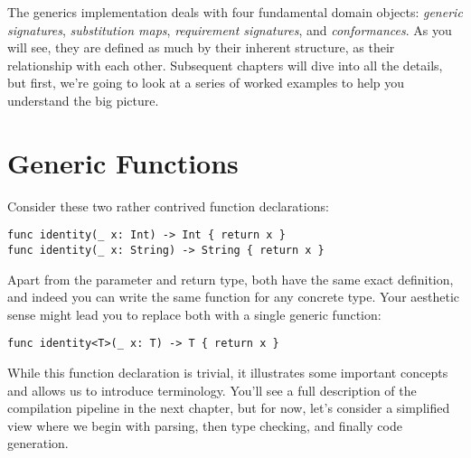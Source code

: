 \documentclass[a4paper,headsepline,bibliography=totoc,toc=flat,fleqn,twoside=semi]{scrbook}
\theoremstyle{definition}
\theoremstyle{definition}
\theoremstyle{definition}
\begin{document}
The generics implementation deals with four fundamental domain objects: \emph{generic signatures}, \emph{substitution maps}, \emph{requirement signatures}, and \emph{conformances}. As you will see, they are defined as much by their inherent structure, as their relationship with each other. Subsequent chapters will dive into all the details, but first, we're going to look at a series of worked examples to help you understand the big picture.

\section{Generic Functions}

Consider these two rather contrived function declarations:
\begin{Verbatim}
func identity(_ x: Int) -> Int { return x }
func identity(_ x: String) -> String { return x }
\end{Verbatim}
Apart from the parameter and return type, both have the same exact definition, and indeed you can write the same function for any concrete type. Your aesthetic sense might lead you to replace both with a single generic function:
\begin{Verbatim}
func identity<T>(_ x: T) -> T { return x }
\end{Verbatim}
While this function declaration is trivial, it illustrates some important concepts and allows us to introduce terminology. You'll see a full description of the compilation pipeline in the next chapter, but for now, let's consider a simplified view where we begin with parsing, then type checking, and finally code generation.

\begin{figure}\label{identity ast}
\begin{center}
\end{center}
\end{figure}
\end{document}

